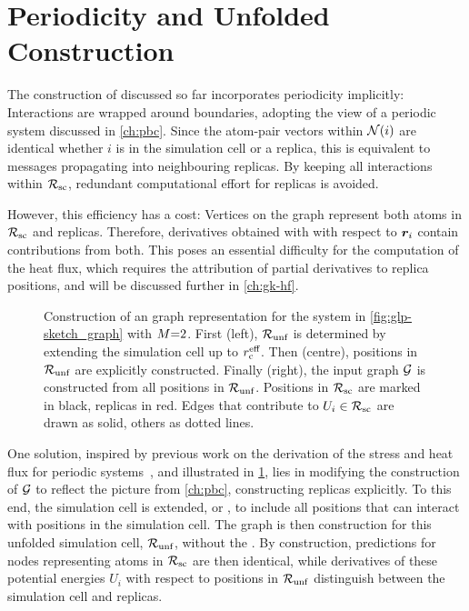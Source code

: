 \section{Periodicity and Unfolded Construction}
\label{sec:glp-unf}

The  construction of \glps discussed so far incorporates periodicity implicitly: Interactions are wrapped around boundaries, adopting the  view of a periodic system discussed in \cref{ch:pbc}.
Since the atom-pair vectors within $\mathcal{N}(i)$ are identical whether $i$ is in the simulation cell or a replica, this is equivalent to messages propagating into neighbouring replicas.
By keeping all interactions within $\mathcal{R_{\text{sc}}}$, redundant computational effort for replicas is avoided.

However, this efficiency has a cost: Vertices on the graph represent both atoms in $\mathcal{R_{\text{sc}}}$ and replicas. Therefore, derivatives obtained with \ad with respect to $\boldsymbol{r}_i$ contain contributions from both. 
This poses an essential difficulty for the computation of the heat flux, which requires the attribution of partial derivatives to replica positions, and will be discussed further in \cref{ch:gk-hf}.


\begin{figure*}
  \caption{Construction of an  graph representation for the system in \cref{fig:glp-sketch_graph} with $M{=}2$. First (left), $\mathcal{R_{\text{unf}}}$ is determined by extending the simulation cell up to $r_{\text{c}}^{\text{eff}}$. Then (centre), positions in $\mathcal{R_{\text{unf}}}$ are explicitly constructed. Finally (right), the input graph $\mathcal{G}$ is constructed from all positions in $\mathcal{R_{\text{unf}}}$. Positions in $\mathcal{R_{\text{sc}}}$ are marked in black, replicas in red. Edges that contribute to $U_i \in \mathcal{R_{\text{sc}}}$ are drawn as solid, others as dotted lines.}
  \label{fig:glp-fig_unf}
\end{figure*}

One solution, inspired by previous work on the derivation of the stress and heat flux for periodic systems~\cite{tpm2009t,khc2012t}, and illustrated in \cref{fig:glp-fig_unf}, lies in modifying the construction of $\mathcal{G}$ to reflect the  picture from \cref{ch:pbc}, constructing replicas explicitly. To this end, the simulation cell is extended, or , to include all positions that can interact with positions in the simulation cell. The graph is then construction for this unfolded simulation cell, $\mathcal{R_{\text{unf}}}$, without the \mic. By construction, predictions for nodes representing atoms in $\mathcal{R_{\text{sc}}}$ are then identical, while derivatives of these potential energies $U_i$ with respect to positions in $\mathcal{R_{\text{unf}}}$ distinguish between the simulation cell and replicas.

